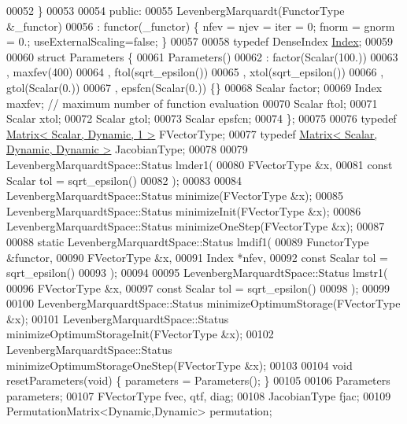 \begin{DoxyCode}
00052     \}
00053     
00054 \textcolor{keyword}{public}:
00055     LevenbergMarquardt(FunctorType &\_functor)
00056         : functor(\_functor) \{ nfev = njev = iter = 0;  fnorm = gnorm = 0.; useExternalScaling=\textcolor{keyword}{false}; \}
00057 
00058     \textcolor{keyword}{typedef} DenseIndex \hyperlink{namespace_eigen_a62e77e0933482dafde8fe197d9a2cfde}{Index};
00059     
00060     \textcolor{keyword}{struct }Parameters \{
00061         Parameters()
00062             : factor(Scalar(100.))
00063             , maxfev(400)
00064             , ftol(sqrt\_epsilon())
00065             , xtol(sqrt\_epsilon())
00066             , gtol(Scalar(0.))
00067             , epsfcn(Scalar(0.)) \{\}
00068         Scalar factor;
00069         Index maxfev;   \textcolor{comment}{// maximum number of function evaluation}
00070         Scalar ftol;
00071         Scalar xtol;
00072         Scalar gtol;
00073         Scalar epsfcn;
00074     \};
00075 
00076     \textcolor{keyword}{typedef} \hyperlink{group___core___module}{Matrix< Scalar, Dynamic, 1 >} FVectorType;
00077     \textcolor{keyword}{typedef} \hyperlink{group___core___module}{Matrix< Scalar, Dynamic, Dynamic >} JacobianType;
00078 
00079     LevenbergMarquardtSpace::Status lmder1(
00080             FVectorType &x,
00081             \textcolor{keyword}{const} Scalar tol = sqrt\_epsilon()
00082             );
00083 
00084     LevenbergMarquardtSpace::Status minimize(FVectorType &x);
00085     LevenbergMarquardtSpace::Status minimizeInit(FVectorType &x);
00086     LevenbergMarquardtSpace::Status minimizeOneStep(FVectorType &x);
00087 
00088     \textcolor{keyword}{static} LevenbergMarquardtSpace::Status lmdif1(
00089             FunctorType &functor,
00090             FVectorType &x,
00091             Index *nfev,
00092             \textcolor{keyword}{const} Scalar tol = sqrt\_epsilon()
00093             );
00094 
00095     LevenbergMarquardtSpace::Status lmstr1(
00096             FVectorType  &x,
00097             \textcolor{keyword}{const} Scalar tol = sqrt\_epsilon()
00098             );
00099 
00100     LevenbergMarquardtSpace::Status minimizeOptimumStorage(FVectorType  &x);
00101     LevenbergMarquardtSpace::Status minimizeOptimumStorageInit(FVectorType  &x);
00102     LevenbergMarquardtSpace::Status minimizeOptimumStorageOneStep(FVectorType  &x);
00103 
00104     \textcolor{keywordtype}{void} resetParameters(\textcolor{keywordtype}{void}) \{ parameters = Parameters(); \}
00105 
00106     Parameters parameters;
00107     FVectorType  fvec, qtf, diag;
00108     JacobianType fjac;
00109     PermutationMatrix<Dynamic,Dynamic> permutation;

\end{DoxyCode}
